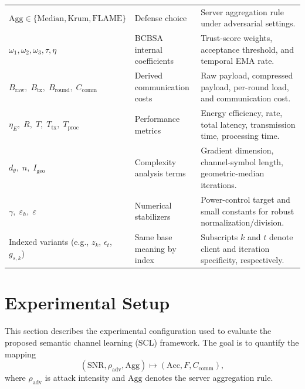 \documentclass[10pt,journal]{IEEEtran}
\begin{document}
\begin{table}[htbp]
\begin{tabular}{p{}p{}p{}}
$\mathrm{Agg}\in\{\mathrm{Median},\mathrm{Krum},\mathrm{FLAME}\}$ & Defense choice & Server aggregation rule under adversarial settings. \\
$\omega_1,\omega_2,\omega_3,\tau,\eta$ & BCBSA internal coefficients & Trust-score weights, acceptance threshold, and temporal EMA rate. \\
$B_{\mathrm{raw}},\;B_{\mathrm{tx}},\;B_{\mathrm{round}},\;C_{\mathrm{comm}}$ & Derived communication costs & Raw payload, compressed payload, per-round load, and communication cost. \\
$\eta_E,\;R,\;T,\;T_{\mathrm{tx}},\;T_{\mathrm{proc}}$ & Performance metrics & Energy efficiency, rate, total latency, transmission time, processing time. \\
$d_\theta,\;n,\;I_{\mathrm{geo}}$ & Complexity analysis terms & Gradient dimension, channel-symbol length, geometric-median iterations. \\
$\gamma,\;\varepsilon_h,\;\varepsilon$ & Numerical stabilizers & Power-control target and small constants for robust normalization/division. \\
\midrule
Indexed variants (e.g., $z_k$, $\epsilon_t$, $g_{s,k}$) & Same base meaning by index & Subscripts $k$ and $t$ denote client and iteration specificity, respectively. \\
\bottomrule
\end{tabular}
\end{table}
\section{Experimental Setup}
This section describes the experimental configuration used to evaluate the proposed semantic channel learning (SCL) framework. The goal is to quantify the mapping
\begin{equation}
\left(\mathrm{SNR},\rho_{\mathrm{adv}},\mathrm{Agg}\right)
\mapsto
\left(\mathrm{Acc},F,C_{\mathrm{comm}}\right),
\end{equation}
where $\rho_{\mathrm{adv}}$ is attack intensity and $\mathrm{Agg}$ denotes the server aggregation rule.
\end{document}
